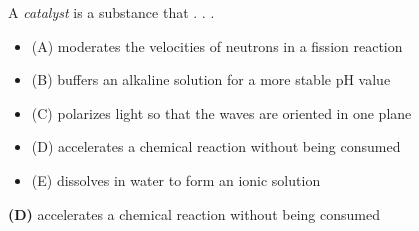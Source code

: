 

A {\it catalyst} is a substance that . . .

\begin{itemize}
\item{(A)} moderates the velocities of neutrons in a fission reaction
\vskip 5pt 
\item{(B)} buffers an alkaline solution for a more stable pH value
\vskip 5pt 
\item{(C)} polarizes light so that the waves are oriented in one plane
\vskip 5pt 
\item{(D)} accelerates a chemical reaction without being consumed
\vskip 5pt 
\item{(E)} dissolves in water to form an ionic solution
\end{itemize}







{\bf (D)} accelerates a chemical reaction without being consumed
 










